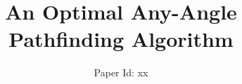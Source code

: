 \documentclass{article}
\begin{document}
\title{An Optimal Any-Angle Pathfinding Algorithm}
\author{Paper Id: xx}

\maketitle











\end{document}
